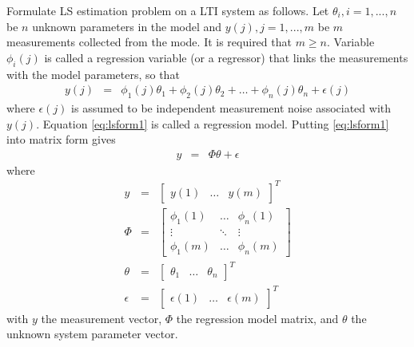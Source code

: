 Formulate LS estimation problem on a LTI system as follows. Let $\theta_i, i=1,...,n$ be $n$ unknown parameters in the model and $y(j), j=1,...,m$ be $m$ measurements collected from the mode. It is required that $m\geq n$. Variable $\phi_i(j)$ is called a regression variable (or a regressor) that links the measurements with the model parameters, so that
\begin{eqnarray}
	y(j) &=& \phi_1(j)\theta_1 + \phi_2(j)\theta_2 + \ldots + \phi_n(j)\theta_n + \epsilon(j) \label{eq:lsform1}
\end{eqnarray}
where $\epsilon(j)$ is assumed to be independent measurement noise associated with $y(j)$. Equation \eqref{eq:lsform1} is called a regression model. Putting \eqref{eq:lsform1} into matrix form gives
\begin{eqnarray}
	y &=& \Phi \theta + \epsilon \label{eq:lsform2}
\end{eqnarray}
where
\begin{eqnarray}
	y &=& \left[\begin{array}{ccc}
	              y(1) & \ldots & y(m)
	            \end{array}\right]^T \nonumber \\
	\Phi &=& \left[\begin{array}{ccc}
		\phi_1(1) & \ldots & \phi_n(1) \\
		\vdots & \ddots & \vdots \\
		\phi_1(m) & \ldots & \phi_n(m)
	\end{array}\right] \nonumber \\
	\theta &=& \left[\begin{array}{ccc}
	                   \theta_1 & \ldots & \theta_n
	                 \end{array}\right]^T \nonumber \\
    \epsilon &=& \left[\begin{array}{ccc}
                         \epsilon(1) & \ldots & \epsilon(m)
                       \end{array}\right]^T \nonumber
\end{eqnarray}
with $y$ the measurement vector, $\Phi$ the regression model matrix, and $\theta$ the unknown system parameter vector.

